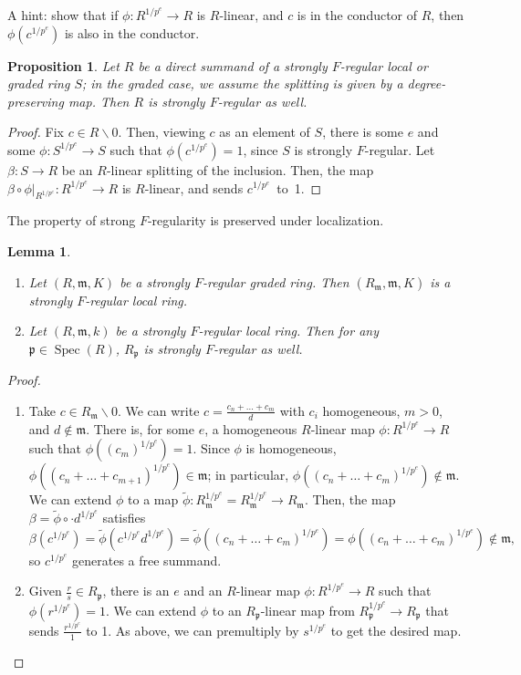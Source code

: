\documentclass[11pt]{book}
\newtheorem{lemma}[theorem]{Lemma}
\newtheorem{proposition}[theorem]{Proposition}
\numberwithin{equation}{section}
\numberwithin{theorem}{chapter}
\theoremstyle{definition}
\newtheorem*{basic properties}{Basic Properties}
\newtheorem*{Important Remark}{Important Remark}
\theoremstyle{remark}
\newcommand{\m}{\mathfrak{m}}
\newcommand{\p}{\mathfrak{p}}
\newcommand{\Spec}{\operatorname{Spec}}
\begin{document}
A hint: show that if $\phi:R^{1/p^e}\to R$ is $R$-linear, and $c$ is in the conductor of $R$, then $\phi(c^{1/p^e})$ is also in the conductor. 


\begin{proposition} Let $R$ be a direct summand of a strongly $F$-regular local or graded ring $S$; in the graded case, we assume the splitting is given by a degree-preserving map. Then $R$ is strongly $F$-regular as well.
\end{proposition}
\begin{proof}
	Fix $c\in R\smallsetminus 0$. Then, viewing $c$ as an element of $S$, there is some $e$ and some $\phi:S^{1/p^e}\to S$ such that $\phi(c^{1/p^e})=1$, since $S$ is strongly $F$-regular. Let $\beta:S\to R$ be an $R$-linear splitting of the inclusion. Then, the map $\beta \circ \phi |_{R^{1/p^e}}: R^{1/p^e} \to R$ is $R$-linear, and sends $c^{1/p^e}$~to~1.
\end{proof}

The property of strong $F$-regularity is preserved under localization.

\begin{lemma}
	\begin{enumerate}
		\item Let $(R,\m,K)$ be a strongly $F$-regular graded ring. Then $(R_\m,\m,K)$ is a strongly $F$-regular local ring.
		\item Let $(R,\m,k)$ be a  strongly $F$-regular local ring. Then for any $\p\in \Spec(R)$, $R_\p$ is strongly $F$-regular as well.
	\end{enumerate}
\end{lemma}
\begin{proof}
	\begin{enumerate}
		\item 
	Take $c\in R_\m \smallsetminus 0$. We can write $c=\frac{c_n + \dots + c_m}{d}$ with $c_i$ homogeneous, $m>0$, and $d\notin \m$. There is, for some $e$, a homogeneous $R$-linear map $\phi:R^{1/p^e}\to R$ such that $\phi((c_m)^{1/p^e})=1$. Since $\phi$ is homogeneous, $\phi((c_n + \dots + c_{m+1})^{1/p^e})\in \m$; in particular, $\phi((c_n + \dots + c_m)^{1/p^e})\notin \m$. We can extend $\phi$ to a map $\widetilde{\phi}:R_{\m}^{1/p^e}=R^{1/p^e}_{\m}\to R_{\m}$. Then, the map $\beta=\widetilde{\phi}\circ \cdot d^{1/p^e}$ satisfies \[\beta(c^{1/p^e})=\widetilde{\phi}(c^{1/p^e}d^{1/p^e})=\widetilde{\phi}((c_n + \dots + c_m)^{1/p^e})=\phi((c_n + \dots + c_m)^{1/p^e})\notin \m,\]
	so $c^{1/p^e}$ generates a free summand.
	\item Given $\frac{r}{s}\in R_\p$, there is an $e$ and an $R$-linear map $\phi:R^{1/p^e}\to R$ such that $\phi(r^{1/p^e})=1$. We can extend $\phi$ to an $R_\p$-linear map from $R_\p^{1/p^e}\to R_\p$ that sends $\frac{r^{1/p^e}}{1}$ to 1. As above, we can premultiply by $s^{1/p^e}$ to get the desired map.\qedhere
		\end{enumerate}
\end{proof}
\end{document}
